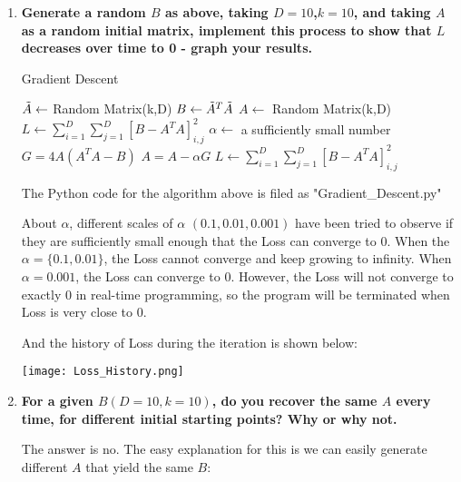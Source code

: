 \documentclass[11pt,letterpaper]{article}
\begin{document}
\begin{enumerate}
\begin{enumerate}
    
    \item \textbf{
    Generate a random $B$ as above, taking $D = 10$,$k = 10$, and taking $A$ as a random initial matrix, implement this process to show that $L$ decreases over time to 0 - graph your results.
    }
    \begin{algorithm}[!h]
        \caption{Gradient Descent}\label{alg:cap}
        \begin{algorithmic}
            \State $\Tilde{A} \gets $ Random Matrix(k,D)
            \State $B \gets \Tilde{A}^T \Tilde{A}$ 
            \State $A \gets $ Random Matrix(k,D)
            \State $L \gets \sum_{i=1}^D\sum_{j=1}^D[B-A^TA]_{i,j}^2$
            \State $\alpha \gets $ a sufficiently small number
            \State $G= 4A(A^TA-B)$
            \State $A = A - \alpha G$
            \State $L \gets \sum_{i=1}^D\sum_{j=1}^D[B-A^TA]_{i,j}^2$
            \EndWhile
        \end{algorithmic}
    \end{algorithm}  
    \begin{flushleft}
        The Python code for the algorithm above is filed as "Gradient\_Descent.py"
    \end{flushleft}
    \begin{flushleft}
        \justifying
        About $\alpha$, different scales of $\alpha$ $(0.1,0.01,0.001)$ have been tried to observe if they are sufficiently small enough that the Loss can converge to $0$. When the $\alpha = \{0.1, 0.01\}$, the Loss cannot converge and keep growing to infinity. When $\alpha = 0.001$, the Loss can converge to 0. However, the Loss will not converge to exactly 0 in real-time programming, so the program will be terminated when Loss is very close to 0.
    \end{flushleft}
    \begin{flushleft}
        \justifying
        And the history of Loss during the iteration is shown below:
    \end{flushleft}
    \begin{center}
        \texttt{[image: Loss\_History.png]}
    \end{center}

    \item \textbf{
     For a given $B (D = 10, k = 10)$, do you recover the same $A$ every time, for different initial starting points? Why or why not.
    }\\
    \begin{flushleft}
        \justifying
        The answer is no. The easy explanation for this is we can easily generate different $A$ that yield the same $B$:
    

\end{flushleft}
\end{enumerate}
\end{enumerate}
\end{document}

